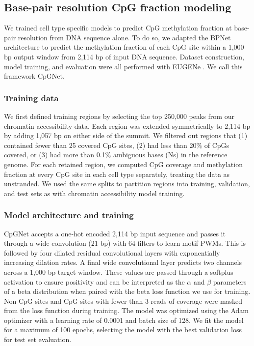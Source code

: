 \subsection{Base-pair resolution CpG fraction modeling}

We trained cell type specific models to predict CpG methylation fraction at base-pair resolution from DNA sequence alone. To do so, we adapted the BPNet architecture \cite{Avsec2021-sw} to predict the methylation fraction of each CpG site within a 1,000 bp output window from 2,114 bp of input DNA sequence. Dataset construction, model training, and evaluation were all performed with EUGENe \cite{Klie2023-yr}. We call this framework CpGNet.

\subsubsection{Training data}

We first defined training regions by selecting the top 250,000 peaks from our chromatin accessibility data. Each region was extended symmetrically to 2,114 bp by adding 1,057 bp on either side of the summit. We filtered out regions that (1) contained fewer than 25 covered CpG sites, (2) had less than 20\% of CpGs covered, or (3) had more than 0.1\% ambiguous bases (Ns) in the reference genome. For each retained region, we computed CpG coverage and methylation fraction at every CpG site in each cell type separately, treating the data as unstranded. We used the same splits to partition regions into training, validation, and test sets as with chromatin accessibility model training.

\subsubsection{Model architecture and training}

CpGNet accepts a one-hot encoded 2,114 bp input sequence and passes it through a wide convolution (21 bp) with 64 filters to learn motif PWMs. This is followed by four dilated residual convolutional layers with exponentially increasing dilation rates. A final wide convolutional layer predicts two channels across a 1,000 bp target window. These values are passed through a softplus activation to ensure positivity and can be interpreted as the \(\alpha\) and \(\beta\) parameters of a beta distribution when paired with the beta loss function we use for training. Non-CpG sites and CpG sites with fewer than 3 reads of coverage were masked from the loss function during training. The model was optimized using the Adam optimizer \cite{Kingma2014-kn} with a learning rate of 0.0001 and batch size of 128. We fit the model for a maximum of 100 epochs, selecting the model with the best validation loss for test set evaluation.

